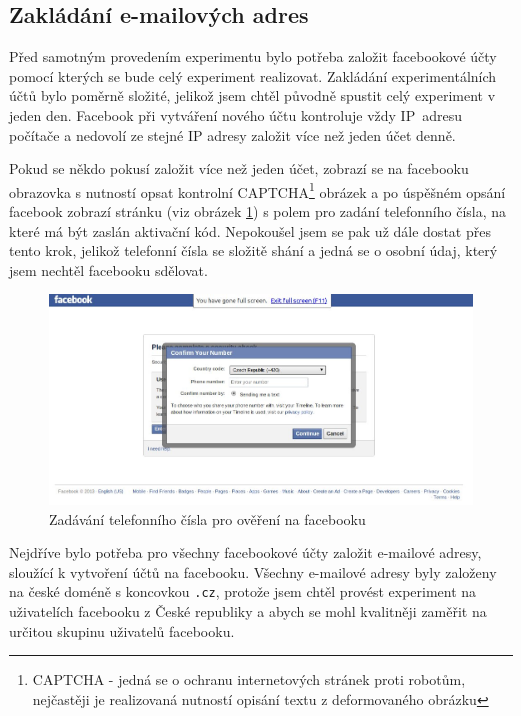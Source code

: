 \documentclass[thesis=M,czech]{FITthesis}[2013/05/10]
\begin{document}
\subsection{Zakládání e-mailových adres}

Před samotným provedením experimentu bylo potřeba založit facebookové účty pomocí kterých se bude celý experiment realizovat. Zakládání experimentálních účtů bylo poměrně složité, jelikož jsem chtěl původně spustit celý experiment v jeden den. Facebook při vytváření nového účtu kontroluje vždy IP~adresu počítače a nedovolí ze stejné IP adresy založit více než jeden účet denně. 

Pokud se někdo pokusí založit více než jeden účet, zobrazí se na facebooku obrazovka s nutností opsat kontrolní CAPTCHA\footnote{CAPTCHA - jedná se o ochranu internetových stránek proti robotům, nejčastěji je realizovaná nutností opisání textu z deformovaného obrázku} obrázek a po úspěšném opsání facebook zobrazí stránku (viz obrázek \ref{fig:fbTelephoneNubmer}) s polem pro zadání telefonního čísla, na které má být zaslán aktivační kód. Nepokoušel jsem se pak už dále dostat přes tento krok, jelikož telefonní čísla se složitě shání a jedná se o osobní údaj, který jsem nechtěl facebooku sdělovat.

\begin{figure}[h]
\begin{center}
\includegraphics[width=5in]{figures/fb-telephone-number2.jpg}
\caption{Zadávání telefonního čísla pro ověření na facebooku}
\label{fig:fbTelephoneNubmer}
\end{center}
\end{figure}

Nejdříve bylo potřeba pro všechny facebookové účty založit e-mailové adresy, sloužící k vytvoření účtů na facebooku. Všechny e-mailové adresy byly založeny na české doméně s koncovkou \verb|.cz|, protože jsem chtěl provést experiment na uživatelích facebooku z České republiky a abych se mohl kvalitněji zaměřit na určitou skupinu uživatelů facebooku. 
\end{document}
